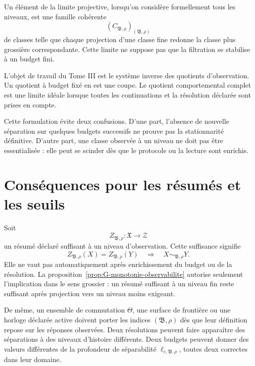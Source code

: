 Un élément de la limite projective, lorsqu'on considère formellement
tous les niveaux, est une famille cohérente
\[
\left(C_{\mathfrak B,\rho}\right)_{(\mathfrak B,\rho)}
\]
de classes telle que chaque projection d'une classe fine redonne la
classe plus grossière correspondante. Cette limite ne suppose pas que
la filtration se stabilise à un budget fini.

\begin{encadre}[title={Lecture effective}]
L'objet de travail du Tome III est le système inverse des quotients
d'observation. Un quotient à budget fixé en est une coupe. Le quotient
comportemental complet est une limite idéale lorsque toutes les
continuations et la résolution déclarée sont prises en compte.
\end{encadre}

Cette formulation évite deux confusions. D'une part, l'absence de
nouvelle séparation sur quelques budgets successifs ne prouve pas la
stationnarité définitive. D'autre part, une classe observée à un niveau
ne doit pas être essentialisée : elle peut se scinder dès que le
protocole ou la lecture sont enrichis.

\section{Conséquences pour les résumés et les seuils}
\label{annexe-histoires-consequences}

Soit
\[
Z_{\mathfrak B,\rho}:\mathfrak X\longrightarrow\mathcal Z
\]
un résumé déclaré suffisant à un niveau d'observation. Cette
suffisance signifie
\begin{equation}
\label{eq:annexe-G-resume-suffisant}
Z_{\mathfrak B,\rho}(X)
=
Z_{\mathfrak B,\rho}(Y)
\quad\Longrightarrow\quad
X\sim_{\mathfrak B,\rho}Y.
\end{equation}
Elle ne vaut pas automatiquement après enrichissement du budget ou de
la résolution. La proposition~\ref{prop:G-monotonie-observabilite} autorise seulement l'implication
dans le sens grossier : un résumé suffisant à un niveau fin reste
suffisant après projection vers un niveau moins exigeant.

De même, un ensemble de commutation \(\Theta\), une surface de frontière
ou une horloge déclarée active doivent porter les indices
\((\mathfrak B,\rho)\) dès que leur définition repose sur les réponses
observées. Deux résolutions peuvent faire apparaître des séparations à
des niveaux d'histoire différents. Deux budgets peuvent donner des
valeurs différentes de la profondeur de séparabilité
\(\ell_{c,\mathfrak B,\rho}\), toutes deux correctes dans leur domaine.

